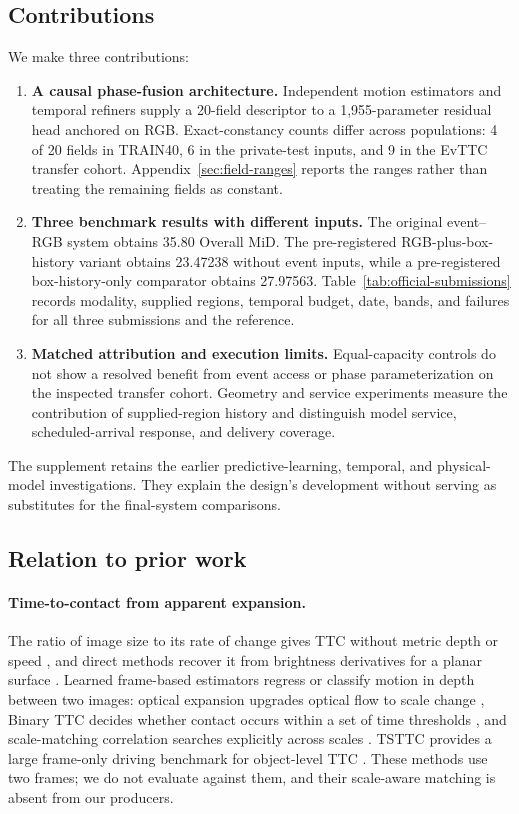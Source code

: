 \subsection{Contributions}
We make three contributions:
\begin{enumerate}
\item \textbf{A causal phase-fusion architecture.} Independent motion estimators and temporal refiners supply a 20-field descriptor to a 1,955-parameter residual head anchored on RGB. Exact-constancy counts differ across populations: 4 of 20 fields in TRAIN40, 6 in the private-test inputs, and 9 in the EvTTC transfer cohort. Appendix~\ref{sec:field-ranges} reports the ranges rather than treating the remaining fields as constant.
\item \textbf{Three benchmark results with different inputs.} The original event--RGB system obtains 35.80 Overall MiD. The pre-registered RGB-plus-box-history variant obtains 23.47238 without event inputs, while a pre-registered box-history-only comparator obtains 27.97563. Table~\ref{tab:official-submissions} records modality, supplied regions, temporal budget, date, bands, and failures for all three submissions and the reference.
\item \textbf{Matched attribution and execution limits.} Equal-capacity controls do not show a resolved benefit from event access or phase parameterization on the inspected transfer cohort. Geometry and service experiments measure the contribution of supplied-region history and distinguish model service, scheduled-arrival response, and delivery coverage.
\end{enumerate}
The supplement retains the earlier predictive-learning, temporal, and physical-model investigations. They explain the design's development without serving as substitutes for the final-system comparisons.

\subsection{Relation to prior work}
\paragraph{Time-to-contact from apparent expansion.} The ratio of image size to its rate of change gives TTC without metric depth or speed \citep{lee1976}, and direct methods recover it from brightness derivatives for a planar surface \citep{horn2007}. Learned frame-based estimators regress or classify motion in depth between two images: optical expansion upgrades optical flow to scale change \citep{yang2020expansion}, Binary TTC decides whether contact occurs within a set of time thresholds \citep{badki2021bittc}, and scale-matching correlation searches explicitly across scales \citep{ling2023tpcv,ling2024scaleflowpp}. TSTTC provides a large frame-only driving benchmark for object-level TTC \citep{shi2023tsttc}. These methods use two frames; we do not evaluate against them, and their scale-aware matching is absent from our producers.

